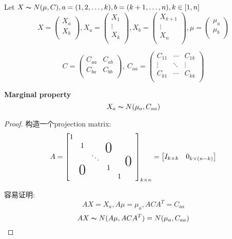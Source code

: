 \documentclass{article}
\begin{document}
\bigskip
Let $X \thicksim{N}(\mu, C), a = (1,2,\ldots, k), b = (k+1, \ldots, n), k \in [1,n]$\\
$$
X =
\begin{pmatrix}
    X_a \\
    X_b \\
\end{pmatrix}
,
X_a =
\begin{pmatrix}
    X_1 \\
    \vdots \\
    X_k \\
\end{pmatrix}
,
X_b =
\begin{pmatrix}
  X_{k+1} \\
  \vdots \\
  X_n \\
\end{pmatrix}
,
\mu =
\begin{pmatrix}
  \mu_a \\
  \mu_b \\
\end{pmatrix}
$$

$$
C =
\begin{pmatrix}
  C_{aa} & C_{ab} \\
  C_{ba} & C_{bb} \\
\end{pmatrix}
,
\
C_{aa} =
\begin{pmatrix}
  C_{11} & \cdots & C_{1k} \\
  \vdots & \ddots & \vdots \\
  C_{k1} & \cdots & C_{kk} \\
\end{pmatrix}
$$
\begin{fact}
\textbf{Marginal property}\\
$$X_a \thicksim{N}(\mu_a, C_{aa})$$
\end{fact}
\begin{proof}
构造一个projection matrix:
\newcommand\bigzero{\makebox(0,0){\text{\huge0}}}
$$
A =
\begin{bmatrix}
    1 &  &  &  &  &&\\
 	  & 1 &  & \bigzero & &&\\
      &   & \ddots &  &  &\bigzero& \\
      & \bigzero & & 1 &  &&\\
      &   &   & & 1 &&\\
\end{bmatrix}_{k \times n}
=
\begin{bmatrix}
	I_{k \times k} & 0_{k \times (n-k)}
\end{bmatrix}
$$

容易证明: $$AX = {X_a}, A\mu = \mu_a, ACA^T = C_{aa}$$
$$AX \thicksim{N}(A\mu, ACA^T) = N(\mu_a, C_{aa})$$
\end{proof}
\end{document}
